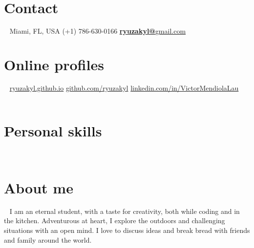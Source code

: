 \documentclass[]{friggeri-cv}
\begin{document}


\begin{aside}
  \section{Contact}
  	~
    Miami, FL, USA
    (+1) 786-630-0166
    \href{mailto:ryuzakyl@gmail.com}{\textbf{ryuzakyl@}gmail.com}
    ~
    ~
    ~
  \section{Online profiles}
  	~
    \href{https://ryuzakyl.github.io}{{\scriptsize ryuzakyl.github.io}}
    \href{https://github.com/ryuzakyl}{{\scriptsize github.com/ryuzakyl}}
    \href{https://www.linkedin.com/in/victormendiolalau}{{\scriptsize linkedin.com/in/VictorMendiolaLau}}
    ~
    ~
    ~
  \section{Personal skills}
    ~
  ~
  ~
  ~
  \section{About me}
    ~
    I am an eternal student, with a taste for creativity, both while coding and in the kitchen. Adventurous at heart, I explore the outdoors and challenging situations with an open mind. I love to discuss ideas and break bread with friends and family around the world.
\end{aside}
\end{document}
